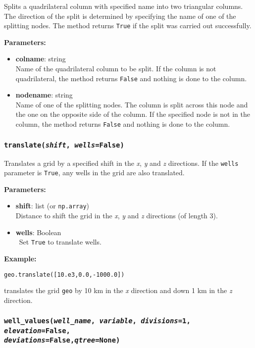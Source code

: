 Splits a quadrilateral column with specified name into two triangular columns.  The direction of the split is determined
by specifying the name of one of the splitting nodes.  The method returns \texttt{True} if the split was carried out successfully.

\textbf{Parameters:}
\begin{itemize}
\item \textbf{colname}: string\\
  Name of the quadrilateral column to be split.  If the column is not quadrilateral, the method returns \texttt{False} and nothing is done to the column.
\item \textbf{nodename}: string\\
  Name of one of the splitting nodes.  The column is split across this node and the one on the opposite side of the column.  If the specified node is not in the column, the method returns \texttt{False} and nothing is done to the column.
\end{itemize}

\subsubsection{\texttt{translate(\emph{shift}, \emph{wells}=\texttt{False})}}

Translates a grid by a specified shift in the \emph{x}, \emph{y} and \emph{z} directions.  If the \texttt{wells} parameter is \texttt{True}, any wells in the grid are also translated.

\textbf{Parameters:}
\begin{itemize}
  \item \textbf{shift}: list (or \texttt{np.array})\\
    Distance to shift the grid in the \emph{x}, \emph{y} and \emph{z} directions (of length 3).
  \item \textbf{wells}: Boolean\\\
    Set \texttt{True} to translate wells.
\end{itemize}

\textbf{Example:}

\begin{verbatim}
geo.translate([10.e3,0.0,-1000.0])
\end{verbatim}

translates the grid \texttt{geo} by 10 km in the \emph{x} direction and down 1 km in the \emph{z} direction.

\subsubsection{\texttt{well\_values(\emph{well\_name}, \emph{variable}, \emph{divisions}=1, \emph{elevation}=\texttt{False}, \\
    \emph{deviations}=\texttt{False},\emph{qtree}=None)}}

